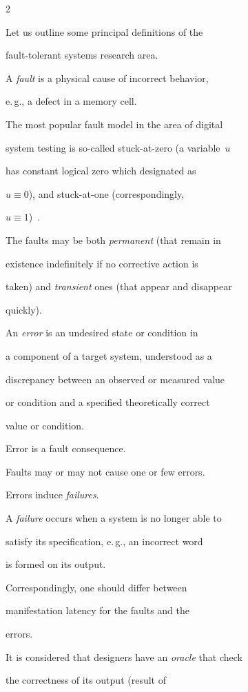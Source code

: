 \begin{multicols}{2}
\noindent

Let us outline some principal definitions of the

fault-tolerant systems research area.

A {\it fault} is a physical cause of incorrect behavior,

e.\,g., a defect in a memory cell.

The most popular fault model in the area of digital

system testing is so-called stuck-at-zero (a variable~$u$

has constant logical zero which designated as

$u\equiv 0$), and stuck-at-one (correspondingly,

$u\equiv 1$)~\cite{2fr}.



The faults may be both \textit{permanent} (that remain in

existence indefinitely if no corrective action is

taken) and \textit{transient} ones (that appear and disappear

quickly).



An \textit{error} is an undesired state or condition in

a component of a target system, understood as a

discrepancy between an observed or measured value

or condition and a specified theoretically correct

value or condition.

Error is a fault consequence.

Faults may or may not cause one or few errors.

Errors induce \textit{failures}.

A \textit{failure} occurs when a system is no longer able to

satisfy its specification, e.\,g., an incorrect word

is formed on its output.



Correspondingly, one should differ between

manifestation latency for the faults and the

errors.

It is considered that designers have an \textit{oracle} that check

the correctness of its output (result of


\end{multicols}
